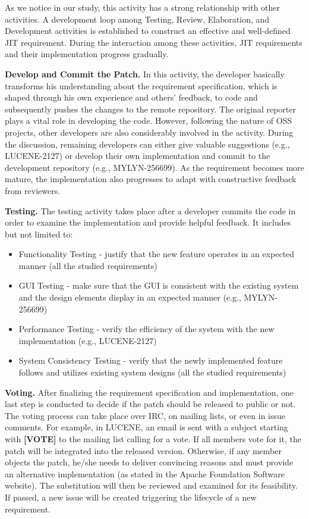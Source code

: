 \documentclass[review]{elsarticle}
\begin{document}
As we notice in our study, this activity has a strong relationship with other activities. A development loop among Testing, Review, Elaboration, and Development activities is established to construct an effective and well-defined JIT requirement. During the interaction among these activities, JIT requirements and their implementation progress gradually.

\textbf{Develop and Commit the Patch.} In this activity, the developer basically transforms his understanding about the requirement specification, which is shaped through his own experience and others' feedback, to code and subsequently pushes the changes to the remote repository. The original reporter plays a vital role in developing the code. However, following the nature of OSS projects, other developers are also considerably involved in the activity. During the discussion, remaining developers can either give valuable suggestions (e.g., LUCENE-2127) or develop their own implementation and commit to the development repository (e.g., MYLYN-256699). As the requirement becomes more mature, the implementation also progresses to adapt with constructive feedback from reviewers.
 
\textbf{Testing.} The testing activity takes place after a developer commits the code in order to examine the implementation and provide helpful feedback. It includes but not limited to:
\begin{itemize}
	\item Functionality Testing - justify that the new feature operates in an expected manner (all the studied requirements)
	\item GUI Testing - make sure that the GUI is consistent with the existing system and the design elements display in an expected manner (e.g., MYLYN-256699)
	\item Performance Testing - verify the efficiency of the system with the new implementation (e.g., LUCENE-2127)
	\item System Consistency Testing - verify that the newly implemented feature follows and utilizes existing system designs (all the studied requirements)
\end{itemize}

\textbf{Voting.} After finalizing the requirement specification and implementation, one last step is conducted to decide if the patch should be released to public or not. The voting process can take place over IRC, on mailing lists,  or even in issue comments. For example, in LUCENE, an email is sent with a subject starting with \textbf{[VOTE]} to the mailing list calling for a vote. If all members vote for it, the patch will be integrated into the released version. Otherwise, if any member objects the patch, he/she needs to deliver convincing reasons and must provide an alternative implementation (as stated in the Apache Foundation Software website). The substitution will then be reviewed and examined for its feasibility. If passed, a new issue will be created triggering the lifecycle of a new requirement.
\end{document}
